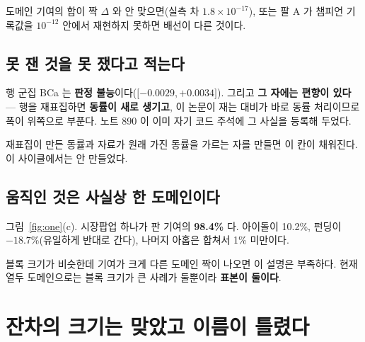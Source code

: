 \documentclass[10pt]{article}
\begin{document}
{도메인 기여의 합이 짝 $\Delta$ 와 안 맞으면(실측 차 $1.8\times10^{-17}$),
또는 팔 A 가 챔피언 기록값을 $10^{-12}$ 안에서 재현하지 못하면 배선이 다른 것이다.}

\subsection{못 잰 것을 못 쟀다고 적는다}

행 군집 BCa 는 \textbf{판정 불능}이다($\lbrack-0.0029,+0.0034\rbrack$). 그리고
\textbf{그 자에는 편향이 있다} --- 행을 재표집하면 \textbf{동률이 새로 생기고},
이 논문이 재는 대비가 바로 동률 처리이므로 폭이 위쪽으로 부푼다. 노트 890 이
이미 자기 코드 주석에 그 사실을 등록해 두었다.

{재표집이 만든 동률과 자료가 원래 가진 동률을 가르는 자를 만들면 이 칸이
채워진다. 이 사이클에서는 안 만들었다.}

\subsection{움직인 것은 사실상 한 도메인이다}

그림~\ref{fig:one}(c). 시장팝업 하나가 판 기여의 \textbf{98.4\%} 다.
아이돌이 10.2\%, 펀딩이 $-18.7\%$(유일하게 반대로 간다), 나머지 아홉은 합쳐서
1\% 미만이다.

{블록 크기가 비슷한데 기여가 크게 다른 도메인 짝이 나오면 이 설명은 부족하다.
현재 열두 도메인으로는 블록 크기가 큰 사례가 둘뿐이라 \textbf{표본이 둘이다}.}

\section{잔차의 크기는 맞았고 이름이 틀렸다}
\end{document}
